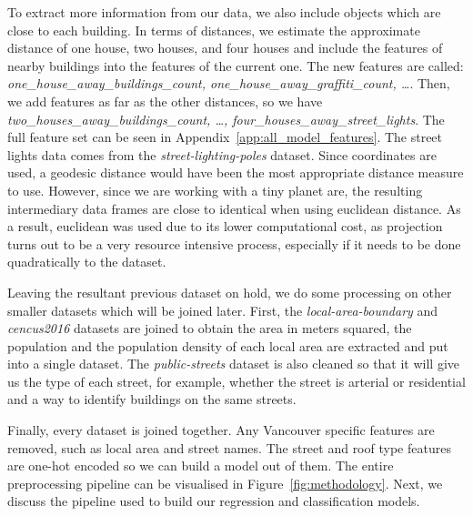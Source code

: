 To extract more information from our data, we also include objects which are close to each building. In terms of distances, we estimate the approximate distance of one house, two houses, and four houses and include the features of nearby buildings into the features of the current one. The new features are called: \textit{one\_house\_away\_buildings\_count, one\_house\_away\_graffiti\_count, \ldots}. Then, we add features as far as the other distances, so we have \textit{two\_houses\_away\_buildings\_count, \ldots, four\_houses\_away\_street\_lights}. The full feature set can be seen in Appendix~\ref{app:all_model_features}. The street lights data comes from the \textit{street-lighting-poles} dataset. Since coordinates are used, a geodesic distance would have been the most appropriate distance measure to use. However, since we are working with a tiny planet are, the resulting intermediary data frames are close to identical when using euclidean distance. As a result, euclidean was used due to its lower computational cost, as projection turns out to be a very resource intensive process, especially if it needs to be done quadratically to the dataset.

Leaving the resultant previous dataset on hold, we do some processing on other smaller datasets which will be joined later. First, the \textit{local-area-boundary} and \textit{cencus2016} datasets are joined to obtain the area in meters squared, the population and the population density of each local area are extracted and put into a single dataset. The \textit{public-streets} dataset is also cleaned so that it will give us the type of each street, for example, whether the street is arterial or residential and a way to identify buildings on the same streets.

Finally, every dataset is joined together. Any Vancouver specific features are removed, such as local area and street names. The street and roof type features are one-hot encoded so we can build a model out of them. The entire preprocessing pipeline can be visualised in Figure~\ref{fig:methodology}. Next, we discuss the pipeline used to build our regression and classification models.

